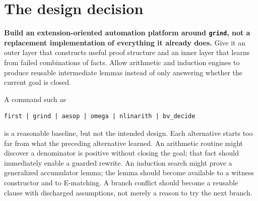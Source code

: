\documentclass[11pt,letterpaper]{article}
\newcommand{\code}[1]{\texttt{\detokenize{#1}}}
\newcommand{\grind}{\texttt{grind}}
\newcommand{\forge}{\texttt{forge}}
\theoremstyle{definition}\newtheorem{definition}[proposition]{Definition}
\begin{document}
\begin{abstract}
A substantially more capable successor to \grind{} should preserve its native, proof-producing treatment of dependent Lean expressions rather than replace it with an untyped external encoding. The proposed \forge{} tactic adds a persistent outer proof-search layer and a conflict-learning ground layer around that foundation. Its principal capabilities are demand-driven theorem application and term construction, explicit existential witnesses, certified nonlinear inequalities, induction with parameter generalization, and learning across Boolean alternatives. The useful unit of cooperation is a \emph{scoped proof obligation with a checked explanation}: neither a raw solver verdict nor an unproved conjecture can enter the fact database.

This article specifies the state model, proof boundary, scheduling policy, certificate formats, algorithms, integration points, and evaluation plan. It distinguishes additions to \grind{} from facilities already present in Lean's ecosystem, notably \code{leanprover/sos}, \code{leanprover/lp}, Aesop, LeanHammer, Lean-SMT, and the bit-vector SAT infrastructure. Three Python prototypes exercise central mechanisms. On a fixed generated corpus, SAT/difference-logic results agree with exhaustive reference checks in 1,500 cases; all 222 unsatisfiable results have replayed certificates. A restricted polynomial oracle certifies seven of ten examples, while deliberately retaining three unknowns. A synthesis loop discovers and exactly validates six generalized accumulator invariants. These are mechanism tests, not evidence of end-to-end Lean performance superiority.
\end{abstract}
\tableofcontents
\clearpage

\section{The design decision}
\label{sec:decision}
\textbf{Build an extension-oriented automation platform around \grind{}, not a replacement implementation of everything it already does.} Give it an outer layer that constructs useful proof structure and an inner layer that learns from failed combinations of facts. Allow arithmetic and induction engines to produce reusable intermediate lemmas instead of only answering whether the current goal is closed.

A command such as
\begin{lstlisting}
first | grind | aesop | omega | nlinarith | bv_decide
\end{lstlisting}
is a reasonable baseline, but not the intended design. Each alternative starts too far from what the preceding alternative learned. An arithmetic routine might discover a denominator is positive without closing the goal; that fact should immediately enable a guarded rewrite. An induction search might prove a generalized accumulator lemma; the lemma should become available to a witness constructor and to E-matching. A branch conflict should become a reusable clause with discharged assumptions, not merely a reason to try the next branch.
\end{document}
